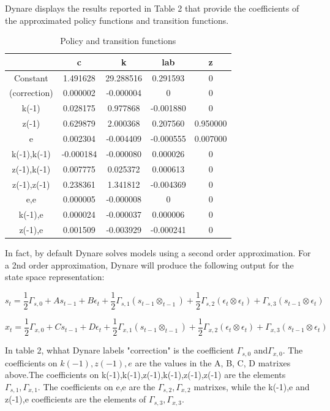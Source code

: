 \documentclass[a4paper,12pt]{scrartcl} %
\begin{document}
Dynare displays the results reported in Table 2 that provide the coefficients of the approximated policy functions and transition functions.

\begin{table}[h]
\centering\caption{Policy and transition functions}\label{2}
\begin{tabular}{ccccc}
  \hline
  &c&k&lab&z\\
  \hline
  Constant&1.491628&29.288516&0.291593&0\\
  (correction)&0.000002&-0.000004&0&0\\
  k(-1)&0.028175&0.977868&-0.001880&0\\
  z(-1)&0.629879&2.000368&0.207560&0.950000\\
  e&0.002304&-0.004409&-0.000555&0.007000\\
  k(-1),k(-1)&-0.000184&-0.000080&0.000026&0\\
  z(-1),k(-1)&0.007775&0.025372&0.000613&0\\
  z(-1),z(-1)&0.238361&1.341812&-0.004369&0\\
  e,e&0.000005&-0.000008&0&0\\
  k(-1),e&0.000024&-0.000037&0.000006&0\\
  z(-1),e&0.001509&-0.003929&-0.000241&0\\
  \hline
  \end{tabular}
\end{table}

In fact, by default Dynare solves models using a second order approximation. For a 2nd order approximation, Dynare will produce the following output for the state space representation:

$$s_t=\frac{1}{2}\Gamma_{s,0}+As_{t-1}+B\epsilon_t+\frac{1}{2}\Gamma_{s,1}(s_{t-1}\otimes_{t-1})+\frac{1}{2}\Gamma_{s,2}(\epsilon_{t}\otimes\epsilon_{t})+\Gamma_{s,3}(s_{t-1}\otimes\epsilon_t)$$

$$x_t=\frac{1}{2}\Gamma_{x,0}+Cs_{t-1}+D\epsilon_t+\frac{1}{2}\Gamma_{x,1}(s_{t-1}\otimes_{t-1})+\frac{1}{2}\Gamma_{x,2}(\epsilon_{t}\otimes\epsilon_{t})+\Gamma_{x,3}(s_{t-1}\otimes\epsilon_t)$$

In table 2, whhat Dynare labels "correction" is the coefficient $\Gamma_{s,0}$ and$\Gamma_{x,0}$. The coefficients on $k(-1),z(-1),e$ are the values in the A, B, C, D matrixes above.The coefficients on k(-1),k(-1),z(-1),k(-1),z(-1),z(-1) are the elements $\Gamma_{s,1},\Gamma_{x,1}$. The coefficients on e,e are the $\Gamma_{s,2},\Gamma_{x,2}$ matrixes, while the k(-1),e and z(-1),e coefficients are the elements of $\Gamma_{s,3},\Gamma_{x,3}$.
\end{document}
